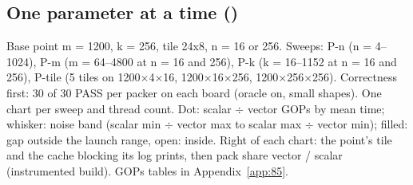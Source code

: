 \subsection{One parameter at a time ()}
Base point m = 1200, k = 256, tile 24x8, n = 16 or 256. Sweeps: P-n (n = 4--1024), P-m (m = 64--4800 at n = 16 and 256), P-k (k = 16--1152 at n = 16 and 256), P-tile (5 tiles on 1200$\times$4$\times$16, 1200$\times$16$\times$256, 1200$\times$256$\times$256). Correctness first: 30 of 30 PASS per packer on each board (oracle on, small shapes). One chart per sweep and thread count. Dot: scalar $\div$ vector GOPs by mean time; whisker: noise band (scalar min $\div$ vector max to scalar max $\div$ vector min); filled: gap outside the launch range, open: inside. Right of each chart: the point's tile and the cache blocking its log prints, then pack share vector / scalar (instrumented build). GOPs tables in Appendix~\ref{app:85}.

\clearpage

